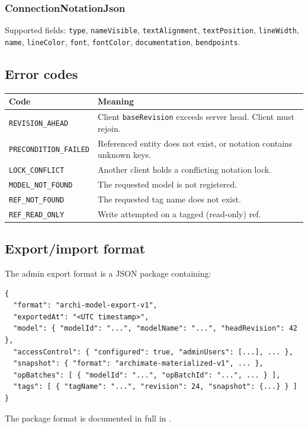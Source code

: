 \subsubsection{ConnectionNotationJson}

Supported fields: \texttt{type}, \texttt{nameVisible},
\texttt{textAlignment}, \texttt{textPosition}, \texttt{lineWidth},
\texttt{name}, \texttt{lineColor}, \texttt{font}, \texttt{fontColor},
\texttt{documentation}, \texttt{bendpoints}.

\subsection{Error codes}

\begin{longtable}{p{46mm}p{108mm}}
\toprule
Code & Meaning \\
\midrule
\texttt{REVISION\_AHEAD} & Client \texttt{baseRevision} exceeds server
  head. Client must rejoin. \\
\texttt{PRECONDITION\_FAILED} & Referenced entity does not exist, or
  notation contains unknown keys. \\
\texttt{LOCK\_CONFLICT} & Another client holds a conflicting notation lock. \\
\texttt{MODEL\_NOT\_FOUND} & The requested model is not registered. \\
\texttt{REF\_NOT\_FOUND} & The requested tag name does not exist. \\
\texttt{REF\_READ\_ONLY} & Write attempted on a tagged (read-only) ref. \\
\bottomrule
\end{longtable}

\subsection{Export/import format}

The admin export format is a JSON package containing:

\begin{lstlisting}[caption={Export package structure}]
{
  "format": "archi-model-export-v1",
  "exportedAt": "<UTC timestamp>",
  "model": { "modelId": "...", "modelName": "...", "headRevision": 42 },
  "accessControl": { "configured": true, "adminUsers": [...], ... },
  "snapshot": { "format": "archimate-materialized-v1", ... },
  "opBatches": [ { "modelId": "...", "opBatchId": "...", ... } ],
  "tags": [ { "tagName": "...", "revision": 24, "snapshot": {...} } ]
}
\end{lstlisting}

The package format is documented in full in .
